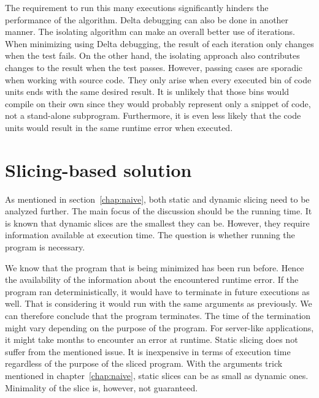 The requirement to run this many executions significantly hinders 
the performance of the algorithm.
Delta debugging can also be done in another manner.
The isolating algorithm can make an overall better use of iterations.
When minimizing using Delta debugging, the result of each iteration 
only changes when the test fails.
On the other hand, the isolating approach also contributes changes 
to the result when the test passes.
However, passing cases are sporadic when working with source code.
They only arise when every executed bin of code units ends with the same 
desired result.
It is unlikely that those bins would compile on their own since 
they would probably represent only a snippet of code, not a stand-alone 
subprogram.
Furthermore, it is even less likely that the code units would result 
in the same runtime error when executed.



\section{Slicing-based solution}\label{chap:systematic}

As mentioned in section~\ref{chap:naive}, both static and dynamic slicing 
need to be analyzed further.
The main focus of the discussion should be the running time.
It is known that dynamic slices are the smallest they can be.
However, they require information available at execution time.
The question is whether running the program is necessary.

We know that the program that is being minimized has been run before.
Hence the availability of the information about the encountered runtime 
error.
If the program ran deterministically, it would have to terminate in future 
executions as well.
That is considering it would run with the same arguments as previously.
We can therefore conclude that the program terminates.
The time of the termination might vary depending on the purpose of 
the program.
For server-like applications, it might take months to encounter an error 
at runtime.
Static slicing does not suffer from the mentioned issue.
It is inexpensive in terms of execution time regardless of the purpose 
of the sliced program.
With the arguments trick mentioned in chapter~\ref{chap:naive}, 
static slices can be as small as dynamic ones.
Minimality of the slice is, however, not guaranteed.

